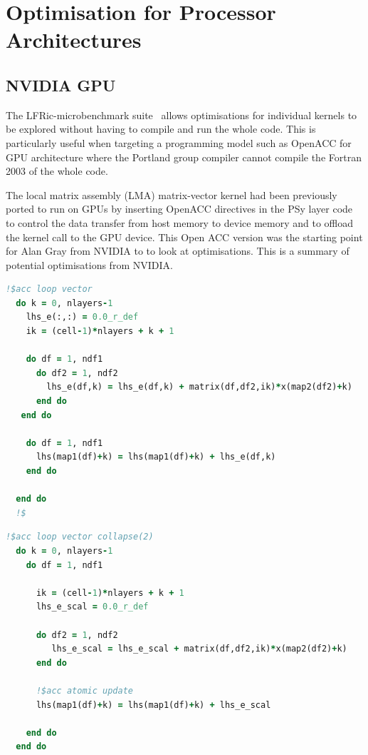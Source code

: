 \section{Optimisation for Processor Architectures
\label{sec:pa}}

\subsection{NVIDIA GPU}
The LFRic-microbenchmark suite~\cite{lfric-microbenchmarks} allows
optimisations for individual kernels to be explored without having to
compile and run the whole code. This is particularly useful when
targeting a programming model such as OpenACC for GPU architecture
where the Portland group compiler cannot compile the Fortran 2003 of
the whole code.

The local matrix assembly (LMA) matrix-vector kernel had been
previously ported to run on GPUs by inserting OpenACC directives in
the PSy layer code to control the data transfer from host memory to
device memory and to offload the kernel call to the GPU device. This
Open ACC version was the starting point for Alan Gray from NVIDIA to
to look at optimisations. This is a summary of potential optimisations
from NVIDIA.

\begin{lstlisting}[language=Fortran,caption={Code fragment of original 
    kernel},label={lst:LMA-orig}]
  !$acc loop vector 
  do k = 0, nlayers-1
    lhs_e(:,:) = 0.0_r_def
    ik = (cell-1)*nlayers + k + 1

    do df = 1, ndf1
      do df2 = 1, ndf2
        lhs_e(df,k) = lhs_e(df,k) + matrix(df,df2,ik)*x(map2(df2)+k)
      end do
   end do

    do df = 1, ndf1
      lhs(map1(df)+k) = lhs(map1(df)+k) + lhs_e(df,k)
    end do

  end do 
  !$
\end{lstlisting}

\begin{lstlisting}[language=Fortran,caption={Optimised
    kernel},label={lst:LMA-opt}]
  !$acc loop vector collapse(2)
  do k = 0, nlayers-1
    do df = 1, ndf1

      ik = (cell-1)*nlayers + k + 1
      lhs_e_scal = 0.0_r_def

      do df2 = 1, ndf2
         lhs_e_scal = lhs_e_scal + matrix(df,df2,ik)*x(map2(df2)+k)
      end do
      
      !$acc atomic update
      lhs(map1(df)+k) = lhs(map1(df)+k) + lhs_e_scal

    end do
  end do
\end{lstlisting}

